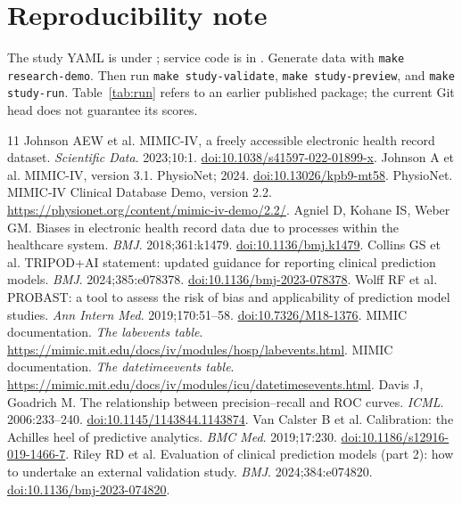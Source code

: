 \documentclass[11pt,a4paper]{article}
\begin{document}
\section*{Reproducibility note}

The study YAML is under ; service code is in . Generate data with \texttt{make research-demo}. Then run \texttt{make study-validate}, \texttt{make study-preview}, and \texttt{make study-run}. Table~\ref{tab:run} refers to an earlier published package; the current Git head does not guarantee its scores.

\begin{thebibliography}{11}
 Johnson AEW et al. MIMIC-IV, a freely accessible electronic health record dataset. \emph{Scientific Data}. 2023;10:1. \href{https://doi.org/10.1038/s41597-022-01899-x}{doi:10.1038/s41597-022-01899-x}.
 Johnson A et al. MIMIC-IV, version 3.1. PhysioNet; 2024. \href{https://doi.org/10.13026/kpb9-mt58}{doi:10.13026/kpb9-mt58}.
 PhysioNet. MIMIC-IV Clinical Database Demo, version 2.2. \url{https://physionet.org/content/mimic-iv-demo/2.2/}.
 Agniel D, Kohane IS, Weber GM. Biases in electronic health record data due to processes within the healthcare system. \emph{BMJ}. 2018;361:k1479. \href{https://doi.org/10.1136/bmj.k1479}{doi:10.1136/bmj.k1479}.
 Collins GS et al. TRIPOD+AI statement: updated guidance for reporting clinical prediction models. \emph{BMJ}. 2024;385:e078378. \href{https://doi.org/10.1136/bmj-2023-078378}{doi:10.1136/bmj-2023-078378}.
 Wolff RF et al. PROBAST: a tool to assess the risk of bias and applicability of prediction model studies. \emph{Ann Intern Med}. 2019;170:51--58. \href{https://doi.org/10.7326/M18-1376}{doi:10.7326/M18-1376}.
 MIMIC documentation. \emph{The labevents table}. \url{https://mimic.mit.edu/docs/iv/modules/hosp/labevents.html}.
 MIMIC documentation. \emph{The datetimeevents table}. \url{https://mimic.mit.edu/docs/iv/modules/icu/datetimesevents.html}.
 Davis J, Goadrich M. The relationship between precision--recall and ROC curves. \emph{ICML}. 2006:233--240. \href{https://doi.org/10.1145/1143844.1143874}{doi:10.1145/1143844.1143874}.
 Van Calster B et al. Calibration: the Achilles heel of predictive analytics. \emph{BMC Med}. 2019;17:230. \href{https://doi.org/10.1186/s12916-019-1466-7}{doi:10.1186/s12916-019-1466-7}.
 Riley RD et al. Evaluation of clinical prediction models (part 2): how to undertake an external validation study. \emph{BMJ}. 2024;384:e074820. \href{https://doi.org/10.1136/bmj-2023-074820}{doi:10.1136/bmj-2023-074820}.
\end{thebibliography}
\end{document}
